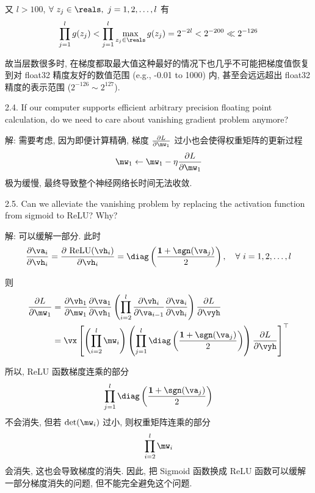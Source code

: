 \documentclass[openany]{ctexbook}
\theoremstyle{kaiti}
\theoremstyle{normal}
\begin{document}
又 $l>100$, $\forall~z_j\in\reals,~j=1,2,\dots,l$ 有
\begin{equation}
  \prod_{j=1}^l g(z_j)<\prod_{j=1}^l \max_{z_j\in\reals}g(z_j)=2^{-2l}<2^{-200}\ll2^{-126}
\end{equation}

故当层数很多时, 在梯度都取最大值这种最好的情况下也几乎不可能把梯度值恢复到对 float32 精度友好的数值范围 (e.g., -0.01 to 1000) 内, 甚至会远远超出 float32 精度的表示范围 ($2^{-126}\sim2^{127}$).

2.4. If our computer supports efficient arbitrary precision floating point calculation, do we need to care about vanishing gradient problem anymore?

解: 需要考虑, 因为即便计算精确, 梯度 $\frac{\partial L}{\partial \mw_1}$ 过小也会使得权重矩阵的更新过程
\begin{equation}
  \mw_1\leftarrow\mw_1-\eta\frac{\partial L}{\partial \mw_1}
\end{equation} 
极为缓慢, 最终导致整个神经网络长时间无法收敛.

2.5. Can we alleviate the vanishing problem by replacing the activation function from sigmoid to ReLU? Why?

解: 可以缓解一部分. 此时
\begin{equation}
  \frac{\partial\va_i}{\partial\vh_i}=\frac{\partial~\mathrm{ReLU}(\vh_i)}{\partial\vh_i}=\diag\left(\frac{\bm{1}+\sgn(\va_j)}{2}\right),\quad\forall~i=1,2,\dots,l
\end{equation}

则
\begin{equation}
  \begin{aligned}
    \frac{\partial L}{\partial\mw_1}
    &=\frac{\partial\vh_1}{\partial\mw_1}
    \frac{\partial\va_{1}}{\partial\vh_{1}}
    \left(\prod_{i=2}^l\frac{\partial\vh_i}{\partial\va_{i-1}}
    \frac{\partial\va_{i}}{\partial\vh_{i}}\right)
    \frac{\partial L}{\partial\vyh}\\
    &=\vx\left[
      \left(\prod_{i=2}^l\mw_i\right)\left(\prod_{j=1}^l\diag\left(\frac{\bm{1}+\sgn(\va_j)}{2}\right)\right)
      \frac{\partial L}{\partial\vyh}
    \right]^\top\\
  \end{aligned}
\end{equation}

所以, ReLU 函数梯度连乘的部分 $$\prod_{j=1}^l\diag\left(\frac{\bm{1}+\sgn(\va_j)}{2}\right)$$ 不会消失, 但若 $\det(\mw_i)$ 过小, 则权重矩阵连乘的部分 $$\prod_{i=2}^l\mw_i$$ 会消失, 这也会导致梯度的消失. 因此, 把 Sigmoid 函数换成 ReLU 函数可以缓解一部分梯度消失的问题, 但不能完全避免这个问题.
\end{document}
